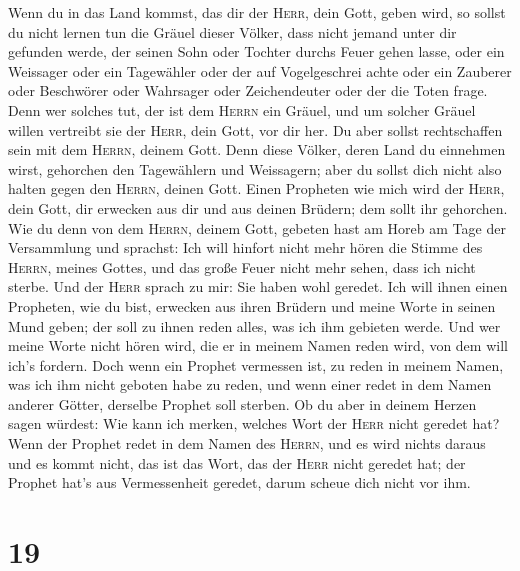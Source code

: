  Wenn du in das Land kommst, das dir der \textsc{Herr},
dein Gott, geben wird, so sollst du nicht lernen tun die Gräuel dieser
Völker,  dass nicht jemand unter dir gefunden werde, der
seinen Sohn oder Tochter durchs Feuer gehen lasse, oder ein Weissager
oder ein Tagewähler oder der auf Vogelgeschrei achte oder ein Zauberer
 oder Beschwörer oder Wahrsager oder Zeichendeuter oder
der die Toten frage.  Denn wer solches tut, der ist dem
\textsc{Herrn} ein Gräuel, und um solcher Gräuel willen vertreibt sie
der \textsc{Herr}, dein Gott, vor dir her.  Du aber
sollst rechtschaffen sein mit dem \textsc{Herrn}, deinem Gott.
 Denn diese Völker, deren Land du einnehmen wirst,
gehorchen den Tagewählern und Weissagern; aber du sollst dich nicht also
halten gegen den \textsc{Herrn}, deinen Gott.  Einen
Propheten wie mich wird der \textsc{Herr}, dein Gott, dir erwecken aus
dir und aus deinen Brüdern; dem sollt ihr gehorchen.  Wie
du denn von dem \textsc{Herrn}, deinem Gott, gebeten hast am Horeb am
Tage der Versammlung und sprachst: Ich will hinfort nicht mehr hören die
Stimme des \textsc{Herrn}, meines Gottes, und das große Feuer nicht mehr
sehen, dass ich nicht sterbe.  Und der \textsc{Herr}
sprach zu mir: Sie haben wohl geredet.  Ich will ihnen
einen Propheten, wie du bist, erwecken aus ihren Brüdern und meine Worte
in seinen Mund geben; der soll zu ihnen reden alles, was ich ihm
gebieten werde.  Und wer meine Worte nicht hören wird,
die er in meinem Namen reden wird, von dem will ich's fordern.
 Doch wenn ein Prophet vermessen ist, zu reden in meinem
Namen, was ich ihm nicht geboten habe zu reden, und wenn einer redet in
dem Namen anderer Götter, derselbe Prophet soll sterben. 
Ob du aber in deinem Herzen sagen würdest: Wie kann ich merken, welches
Wort der \textsc{Herr} nicht geredet hat?  Wenn der
Prophet redet in dem Namen des \textsc{Herrn}, und es wird nichts daraus
und es kommt nicht, das ist das Wort, das der \textsc{Herr} nicht
geredet hat; der Prophet hat's aus Vermessenheit geredet, darum scheue
dich nicht vor ihm.

\hypertarget{section-18}{%
\section{19}\label{section-18}}

